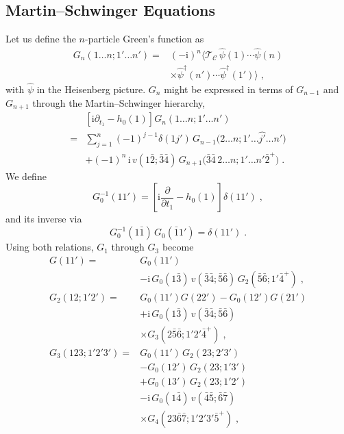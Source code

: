 \documentclass[aip,jcp,reprint,noshowkeys,superscriptaddress]{revtex4-1}
\newcommand{\ii}{\mathrm{i}}
\begin{document}
\subsection{Martin--Schwinger Equations}
\label{sec:MS}
Let us define the $n$-particle Green's function as 
\begin{equation}
	\label{eq:Gn_definition}
\begin{aligned}
G_n(1\ldots n;1'\ldots n')
={}&
(-\ii)^n
\big\langle
\mathcal{T}_{\mathcal{C}}\,
\hat{\psi}(1)\cdots\hat{\psi}(n)
\\
&\times
\hat{\psi}^{\dagger}(n')\cdots\hat{\psi}^{\dagger}(1')
\big\rangle \;,
\end{aligned}
\end{equation}
with $\hat{\psi}$ in the Heisenberg picture.
$G_n$ might be expressed in terms of $G_{n-1}$ and
$G_{n+1}$ through the
Martin--Schwinger hierarchy,\cite{Martin1959}
\begin{align}
&
\left[
\ii\partial_{t_1}
-
h_0(1)
\right]
G_n(1\ldots n;1'\ldots n')
\nonumber\\
={}&
\sum_{j=1}^{n}
(-1)^{j-1}
\delta(1j')\,
G_{n-1}
\bigl(
2\ldots n;
1'\ldots \widehat{j'}\ldots n'
\bigr)
\nonumber\\
&+
(-1)^{n}\,\ii\,
v(1\bar2;\bar3\bar4)\,
G_{n+1}
\bigl(
\bar3\bar4\,2\ldots n;
1'\ldots n'\bar2^{+}
\bigr) \;.
\label{eq:Martin_Schwinger_general}
\end{align}
We define 
\begin{equation}
G_0^{-1}(11')
=
\left[
\ii\frac{\partial}{\partial t_1}
-
h_0(1)
\right]
\delta(11') \;,
\label{eq:G0_inverse_def}
\end{equation}
and its inverse via
\begin{equation}
\label{eq:G0_inverse}
G_0^{-1}(1\bar{1})\,
G_0(\bar{1}1')
=
\delta(11') \;.
\end{equation}
Using both relations, $G_1$ through $G_3$ become
\begin{align}
G(11')
= & 
G_0(11')
\nonumber\\
& -\ii \,
G_0(1\bar3)\,
v(\bar3\bar4;\bar5\bar6)\,
G_2(\bar5\bar6;1'\bar4^+) \;,
\label{eq:Martin_Schwinger_G1} \\
G_2(12;1'2')
= & 
G_0(11')G(22')
-
G_0(12')G(21')
\nonumber\\
& +
\ii \,
G_0(1\bar3)\,
v(\bar3\bar4;\bar5\bar6)
\nonumber\\
&\times
G_3(2\bar5\bar6;1'2'\bar4^+) \;,
\label{eq:Martin_Schwinger_G2}\\
G_3(123;1'2'3')
= &
G_0(11')\,
G_2(23;2'3') \nonumber \\
& -
G_0(12')\,
G_2(23;1'3')
\nonumber\\
& +
G_0(13')\,
G_2(23;1'2')
\nonumber\\
& -
\ii\,
G_0(1\bar4)\,
v(\bar4\bar5;\bar6\bar7)
\nonumber\\
&\times
G_4(23\bar6\bar7;1'2'3'\bar5^+) \;,
\label{eq:Martin_Schwinger_G3}
\end{align}
\end{document}
